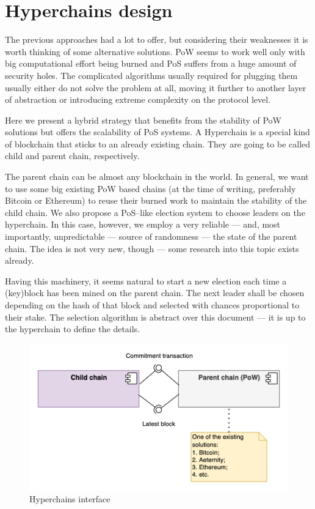 \section{Hyperchains design}
\graphicspath{ {./images/} }

The previous approaches had a lot to offer, but considering their weaknesses it is worth
thinking of some alternative solutions. PoW seems to work well only with big
computational effort being burned and PoS suffers from a huge amount of security
holes. The complicated algorithms usually required for plugging them usually
either do not solve
the problem at all, moving it further to another layer of abstraction or introducing
extreme complexity on the protocol level.

Here we present a hybrid strategy that benefits from the stability of PoW
solutions but offers the scalability of PoS systems. A Hyperchain is a
special kind of blockchain that sticks to an already existing chain. They are
going to be called child and parent chain, respectively\cite{hyperchains}.

The parent chain can be almost any blockchain in the world. In general, we want
to use some big existing PoW based chains (at the time of writing, preferably
Bitcoin or Ethereum) to reuse their burned work to maintain
the stability of the child chain. We also propose a
PoS–like election system to choose leaders on the hyperchain. In this case,
however, we employ a very reliable — and, most importantly, unpredictable — source
of randomness — the state of the parent chain. The idea is not very new,
though — some research into this topic exists already\cite{blockchain_random}.

Having this machinery, it seems natural to start a new election each time a
(key)block has been mined on the parent chain. The next leader shall be chosen
depending on the hash of that block and selected with chances proportional to
their stake. The selection algorithm is abstract over this document — it is
up to the hyperchain to define the details.

\begin{figure}[b]
     \caption{Hyperchains interface}
     \centering
     \includegraphics[scale=0.5]{hyperchains_interface}
\end{figure}

